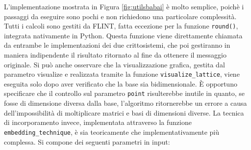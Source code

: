 L'implementazione mostrata in Figura \ref{fig:utilsbabai} è molto semplice, poichè
i passaggi da eseguire sono pochi e non richiedono una particolare complessità. 
Tutti i calcoli sono gestiti da FLINT, fatta eccezione per la funzione \texttt{round()},
integrata nativamente in Python.
Questa funzione viene direttamente chiamata da entrambe le implementazioni dei due 
crittosistemi, che poi gestiranno in maniera indipendente il risultato ritornato al
fine da ottenere il messaggio originale. 
Si può anche osservare che la visualizzazione grafica, gestita dal parametro visualize 
e realizzata tramite la funzione \texttt{visualize\_lattice}, viene eseguita solo dopo 
aver verificato che la base sia bidimensionale.
È opportuno specificare che il controllo sul parametro \texttt{point} risulterebbe inutile
in quanto, se fosse di dimensione diversa dalla base, l'algoritmo ritornerebbe un errore 
a causa dell'impossibilità di moltiplicare matrici e basi di dimensioni diverse. 
La tecnica di incorporamento invece, implementata attraverso la funzione \\
\texttt{embedding\_technique}, è sia teoricamente che implementativamente più complessa. 
Si compone dei seguenti parametri in input:
